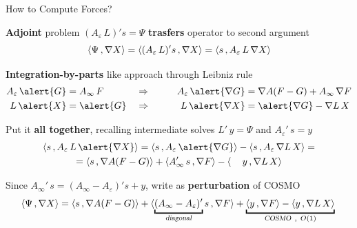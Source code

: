 \begin{frame}{How to Compute Forces?}
{\begin{wideitemize}

\item {\bf Adjoint} problem $(A_\varepsilon \, L)' s = \Psi$ {\bf trasfers} operator to second argument
\[
\langle \Psi \, , \nabla X \rangle = \langle (A_\varepsilon \, L)' s \, , \nabla X \rangle = \langle  s \, , A_\varepsilon \, L \,\nabla X \rangle \displaybump
\]

\item {\bf Integration-by-parts} like approach through Leibniz rule
\begin{alignat*}{4}
A_\varepsilon \, \alert{G}& = A_\infty \, F  \qquad && \Rightarrow \qquad &  A_\varepsilon \, \alert{\nabla G} & = \nabla A ( F -G) + A_\infty \, \nabla F \displaybump \\
L \, \alert{X} & = \alert{G} &&\Rightarrow  &L \, \alert{\nabla X} & = \alert{\nabla G} - \nabla L \,  X
\end{alignat*}
\item Put it {\bf all together}, recalling intermediate solves $L' \, y= \Psi$ and $A_\varepsilon' \, s = y$
\begin{multline*}
\langle  s \, , A_\varepsilon \, L \,\alert{\nabla X} \rangle = \langle  s \, , A_\varepsilon \, \alert{\nabla G} \rangle -\langle  s \, ,A_\varepsilon \,  \nabla L \,  X  \rangle = \\
= \langle  s \, ,\nabla A ( F - G) \rangle + \langle A_\infty' \,  s \, ,  \nabla F \rangle -\langle \phantom{A_\varepsilon' } y \, , \nabla L \,  X  \rangle \displaybump
\end{multline*}
\item Since $A_\infty' \, s = (A_\infty - A_\varepsilon)' s + y$, write as {\bf perturbation} of COSMO
\[
\langle \Psi \, , \nabla X \rangle = \langle  s \, ,\nabla A ( F - G) \rangle + \langle \underbracket{(A_\infty - A_\varepsilon)'}_{\textsl{diagonal}} s \, ,  \nabla F \rangle + \underbracket{\langle y \, , \nabla F \rangle - \langle  y \, ,  \nabla L \,  X  \rangle}_{\textsl{COSMO} \:\: , \:\: O(1)} \displaybump
\]

\end{wideitemize}

}


\end{frame}


